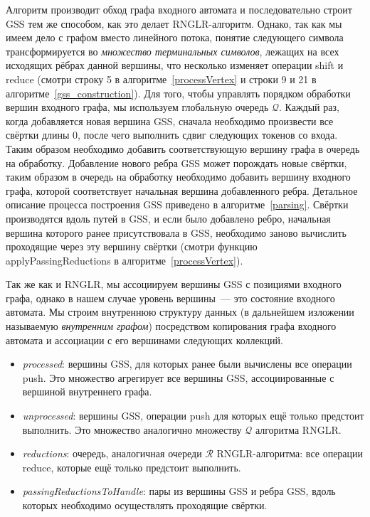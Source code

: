 Алгоритм производит обход графа входного автомата и последовательно строит GSS тем же способом, как это делает RNGLR-алгоритм. Однако, так как мы имеем дело с графом вместо линейного потока, понятие следующего символа трансформируется во \emph{множество терминальных символов}, лежащих на всех исходящих рёбрах данной вершины, что несколько изменяет операции shift и reduce (смотри строку 5 в алгоритме~\ref{processVertex} и строки 9 и 21 в алгоритме~\ref{gss_construction}). Для того, чтобы управлять порядком обработки вершин входного графа, мы используем глобальную очередь $\mathcal{Q}$. Каждый раз, когда добавляется новая вершина GSS, сначала необходимо произвести все свёртки длины 0, после чего выполнить сдвиг следующих токенов со входа. Таким образом необходимо добавить соответствующую вершину графа в очередь на обработку. Добавление нового ребра GSS может порождать новые свёртки, таким образом в очередь на обработку необходимо добавить вершину входного графа, которой соответствует начальная вершина добавленного ребра. Детальное описание процесса построения GSS приведено в алгоритме~\ref{parsing}. Свёртки производятся вдоль путей в GSS, и если было добавлено ребро, начальная вершина которого ранее присутствовала в GSS, необходимо заново вычислить проходящие через эту вершину свёртки (смотри функцию applyPassingReductions в алгоритме~\ref{processVertex}).


Так же как и RNGLR, мы ассоциируем вершины GSS с позициями входного графа, однако в нашем случае уровень вершины~--- это состояние входного автомата. Мы строим внутреннюю структуру данных (в дальнейшем изложении называемую \emph{внутренним графом}) посредством копирования графа входного автомата и ассоциации с его вершинами следующих коллекций.
\begin{itemize}
  \item \emph{processed}: вершины GSS, для которых ранее были вычислены все операции push. Это множество агрегирует все вершины GSS, ассоциированные с вершиной внутреннего графа.
  \item \emph{unprocessed}: вершины GSS, операции push для которых ещё только предстоит выполнить. Это множество аналогично множеству $\mathcal{Q}$ алгоритма RNGLR.
  \item \emph{reductions}: очередь, аналогичная очереди $\mathcal{R}$ RNGLR-алгоритма: все операции reduce, которые ещё только предстоит выполнить.
  \item \emph{passingReductionsToHandle}: пары из вершины GSS и ребра GSS, вдоль которых необходимо осуществлять проходящие свёртки.
\end{itemize}

